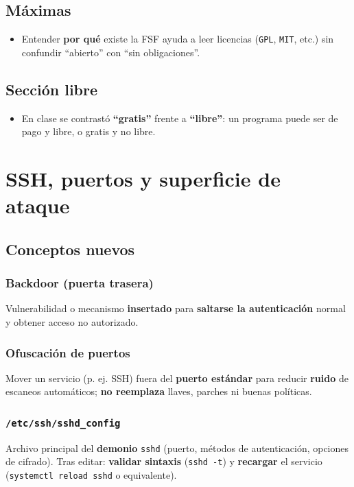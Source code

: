 \documentclass[11pt, letterpaper]{article}
\begin{document}
\subsection{Máximas}
\label{sec:org3a5076a}

\begin{itemize}
\item Entender \textbf{por qué} existe la FSF ayuda a leer licencias (\texttt{GPL}, \texttt{MIT}, etc.) sin confundir “abierto” con “sin obligaciones”.
\end{itemize}
\subsection{Sección libre}
\label{sec:org1f33d12}

\begin{itemize}
\item En clase se contrastó \textbf{“gratis”} frente a \textbf{“libre”}: un programa puede ser de pago y libre, o gratis y no libre.
\end{itemize}
\section{SSH, puertos y superficie de ataque}
\label{sec:orgb007b3e}

\subsection{Conceptos nuevos}
\label{sec:org2d86eaa}

\subsubsection{Backdoor (puerta trasera)}
\label{sec:orgefeb0c1}
Vulnerabilidad o mecanismo \textbf{insertado} para \textbf{saltarse la autenticación} normal y obtener acceso no autorizado.
\subsubsection{Ofuscación de puertos}
\label{sec:orgee0acb2}
Mover un servicio (p. ej. SSH) fuera del \textbf{puerto estándar} para reducir \textbf{ruido} de escaneos automáticos; \textbf{no reemplaza} llaves, parches ni buenas políticas.
\subsubsection{\texttt{/etc/ssh/sshd\_config}}
\label{sec:org0f32f51}
Archivo principal del \textbf{demonio} \texttt{sshd} (puerto, métodos de autenticación, opciones de cifrado). Tras editar: \textbf{validar sintaxis} (\texttt{sshd -t}) y \textbf{recargar} el servicio (\texttt{systemctl reload sshd} o equivalente).
\end{document}

